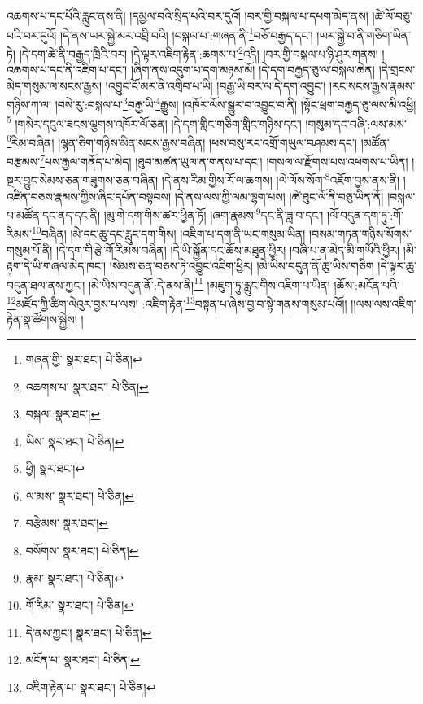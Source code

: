 འཆགས་པ་དང་པོའི་རླུང་ནས་ནི། །དམྱལ་བའི་སྲིད་པའི་བར་དུའོ། །བར་གྱི་བསྐལ་པ་དཔག་མེད་ནས། །ཚེ་ལོ་བཅུ་པའི་བར་དུའོ། །དེ་ནས་ཡར་སྐྱེ་མར་འབྲི་བའི། །བསྐལ་པ་:གཞན་ནི་\footnote{གཞན་གྱི་  སྣར་ཐང་།  པེ་ཅིན། }བཅོ་བརྒྱད་དང་། །ཡར་སྐྱེ་བ་ནི་གཅིག་ཡིན་ཏེ། །དེ་དག་ཚེ་ནི་བརྒྱད་ཁྲིའི་བར། །དེ་ལྟར་འཇིག་རྟེན་:ཆགས་པ་\footnote{འཆགས་པ་  སྣར་ཐང་།  པེ་ཅིན། }འདི། །བར་གྱི་བསྐལ་པ་ཉི་ཤུར་གནས། །འཆགས་པ་དང་ནི་འཇིག་པ་དང་། །ཞིག་ནས་འདུག་པ་དག་མཉམ་མོ། །དེ་དག་བརྒྱད་ཅུ་ལ་བསྐལ་ཆེན། །དེ་གྲངས་མེད་གསུམ་ལ་སངས་རྒྱས། །འབྱུང་ངོ་མར་ནི་འགྲིབ་པ་ཡི། །བརྒྱ་ཡི་བར་ལ་དེ་དག་འབྱུང་། །རང་སངས་རྒྱས་རྣམས་གཉིས་ཀ་ལ། །བསེ་རུ་:བསྐལ་པ་\footnote{བསྐལ་  སྣར་ཐང་། }བརྒྱ་ཡི་\footnote{ཡིས་  སྣར་ཐང་།  པེ་ཅིན། }རྒྱུས། །འཁོར་ལོས་སྒྱུར་བ་འབྱུང་བ་ནི། །སྟོང་ཕྲག་བརྒྱད་ཅུ་ལས་མི་འཕྱི།\footnote{ཕྱི།  སྣར་ཐང་། } །གསེར་དངུལ་ཟངས་ལྕགས་འཁོར་ལོ་ཅན། །དེ་དག་གླིང་གཅིག་གླིང་གཉིས་དང་། །གསུམ་དང་བཞི་:ལས་མས་\footnote{ལ་མས་  སྣར་ཐང་།  པེ་ཅིན། }རིམ་བཞིན། །ལྷན་ཅིག་གཉིས་མིན་སངས་རྒྱས་བཞིན། །ཕས་བསུ་རང་འགྲོ་གཡུལ་བཤམས་དང་། །མཚོན་བརྩམས་\footnote{བརྩེམས་  སྣར་ཐང་། }པས་རྒྱལ་གནོད་པ་མེད། །ཐུབ་མཚན་ཡུལ་ན་གནས་པ་དང་། །གསལ་ལ་རྫོགས་པས་འཕགས་པ་ཡིན། །སྔར་བྱུང་སེམས་ཅན་གཟུགས་ཅན་བཞིན། །དེ་ནས་རིམ་གྱིས་རོ་ལ་ཆགས། །ལེ་ལོས་སོག་\footnote{བསོགས་  སྣར་ཐང་།  པེ་ཅིན། }འཇོག་བྱས་ནས་ནི། །འཛིན་བཅས་རྣམས་ཀྱིས་ཞིང་དཔོན་བསྟབས། །དེ་ནས་ལས་ཀྱི་ལམ་ལྷག་པས། །ཚེ་ཐུང་ལོ་ནི་བཅུ་ཡིན་ནོ། །བསྐལ་པ་མཚོན་དང་ནད་དང་ནི། །མུ་གེ་དག་གིས་ཚར་ཕྱིན་ཏོ། །ཞག་རྣམས་\footnote{རྣམ་  སྣར་ཐང་།  པེ་ཅིན། }དང་ནི་ཟླ་བ་དང་། །ལོ་བདུན་དག་ཏུ་:གོ་རིམས་\footnote{གོ་རིམ་  སྣར་ཐང་།  པེ་ཅིན། }བཞིན། །མེ་དང་ཆུ་དང་རླུང་དག་གིས། །འཇིག་པ་དག་ནི་ཡང་གསུམ་ཡིན། །བསམ་གཏན་གཉིས་སོགས་གསུམ་པོ་ནི། །དེ་དག་གི་རྩེ་གོ་རིམས་བཞིན། །དེ་ཡི་སྐྱོན་དང་ཆོས་མཐུན་ཕྱིར། །བཞི་པ་ན་མེད་མི་གཡོའི་ཕྱིར། །མི་རྟག་དེ་ཡི་གཞལ་མེད་ཁང་། །སེམས་ཅན་བཅས་ཏེ་འབྱུང་འཇིག་ཕྱིར། །མེ་ཡིས་བདུན་ནོ་ཆུ་ཡིས་གཅིག །དེ་ལྟར་ཆུ་བདུན་ཐལ་ནས་ཀྱང་། །མེ་ཡིས་བདུན་ནོ་:དེ་ནས་ནི།\footnote{དེ་ནས་ཀྱང་།  སྣར་ཐང་།  པེ་ཅིན། } །མཇུག་ཏུ་རླུང་གིས་འཇིག་པ་ཡིན། །ཆོས་:མངོན་པའི་\footnote{མངོན་པ་  སྣར་ཐང་།  པེ་ཅིན། }མཛོད་ཀྱི་ཚིག་ལེའུར་བྱས་པ་ལས། :འཇིག་རྟེན་\footnote{འཇིག་རྟེན་པ་  སྣར་ཐང་།  པེ་ཅིན། }བསྟན་པ་ཞེས་བྱ་བ་སྟེ་གནས་གསུམ་པའོ།། །།ལས་ལས་འཇིག་རྟེན་སྣ་ཚོགས་སྐྱེས། །
